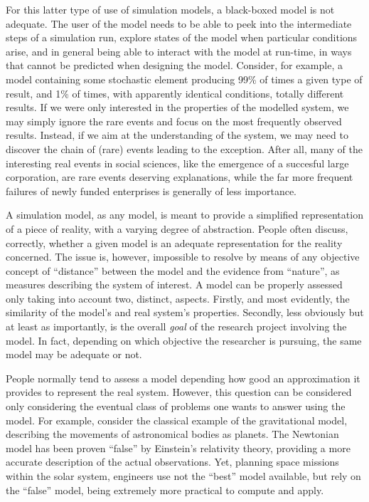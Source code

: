 \documentclass [11pt,a4paper] {book}
\begin{document}
For this latter type of use of simulation models, a black-boxed model is not adequate. The user of the model needs to be able to peek into the intermediate steps of a simulation run, explore states of the model when particular conditions arise, and in general being able to interact with the model at run-time, in ways that cannot be predicted when designing the model. Consider, for example, a model containing some stochastic element  producing 99\% of times a given type of result, and 1\% of times, with apparently identical conditions, totally different results. If we were only interested in the properties of the modelled system, we may simply ignore the rare events and focus on the most frequently observed results. Instead, if we aim at the understanding of the system, we may need to discover the chain of (rare) events leading to the exception. After all, many of the interesting real events in social sciences, like the emergence of a succesful large corporation, are rare events deserving explanations, while the far more frequent failures of newly funded enterprises is generally of less importance.



A simulation model, as any model, is meant to provide a simplified representation of a piece of reality, with a varying degree of abstraction. People often discuss, correctly, whether a given model is an adequate representation for the reality concerned. The issue is, however, impossible to resolve by means of any objective concept of ``distance'' between the model and the evidence from ``nature'', as measures describing the system of interest. A model can be properly assessed only taking into account two, distinct, aspects. Firstly, and most evidently, the similarity of the model's and real system's properties. Secondly, less obviously but at least as importantly, is the overall \textit{goal} of the research project involving the model. In fact, depending on which objective the researcher is pursuing, the same model may be adequate or not.

People normally tend to assess a model depending how good an approximation it provides to represent the real system. However, this question can be considered only considering the eventual class of problems one wants to answer using the model. For example, consider the classical example of the gravitational model, describing the movements of astronomical bodies as planets. The Newtonian model has been proven ``false'' by Einstein's relativity theory, providing a more accurate description of the actual observations. Yet, planning space missions within the solar system, engineers use not the ``best'' model available, but rely on the ``false'' model, being extremely more practical to compute and apply.
\end{document}
